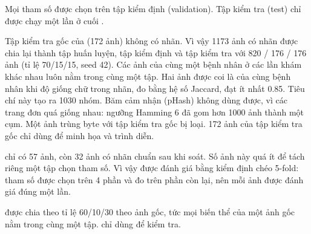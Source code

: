 Mọi tham số được chọn trên tập kiểm định (validation).
Tập kiểm tra (test) chỉ được chạy một lần ở cuối .

Tập kiểm tra gốc của  (172 ảnh) không có nhãn.
Vì vậy \num{1173} ảnh có nhãn được chia lại thành tập huấn luyện, tập kiểm định và tập kiểm tra với 820 / 176 / 176 ảnh (tỉ lệ 70/15/15, seed 42).
Các ảnh của cùng một bệnh nhân ở các lần khám khác nhau luôn nằm trong cùng một tập.
Hai ảnh được coi là của cùng bệnh nhân khi độ giống chữ trong nhãn, đo bằng hệ số Jaccard, đạt ít nhất \num{0.85}.
Tiêu chí này tạo ra \num{1030} nhóm.
Băm cảm nhận (pHash) không dùng được, vì các trang đơn quá giống nhau: ngưỡng Hamming 6 đã gom hơn \num{1000} ảnh thành một cụm.
Một ảnh trùng byte với tập kiểm tra gốc bị loại.
172 ảnh của tập kiểm tra gốc chỉ dùng để minh họa và trình diễn.

 chỉ có 57 ảnh, còn 32 ảnh có nhãn chuẩn sau khi soát.
Số ảnh này quá ít để tách riêng một tập chọn tham số.
Vì vậy  được đánh giá bằng kiểm định chéo 5-fold: tham số được chọn trên 4 phần và đo trên phần còn lại, nên mỗi ảnh được đánh giá đúng một lần.

 được chia theo tỉ lệ 60/10/30 theo ảnh gốc, tức mọi biến thể của một ảnh gốc nằm trong cùng một tập.
 chỉ dùng để kiểm tra.
